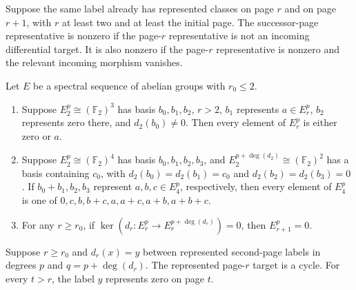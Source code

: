 \begin{theorem}
\label{sem:SpectralSequence:successor-nonzero}
Suppose the same label already has represented classes on page $r$ and on page $r+1$, with $r$ at least two and at least the initial page. The successor-page representative is nonzero if the page-$r$ representative is not an incoming differential target. It is also nonzero if the page-$r$ representative is nonzero and the relevant incoming morphism vanishes.
\end{theorem}

\begin{theorem}
\label{sem:SpectralSequence:finite-frames}
Let $E$ be a spectral sequence of abelian groups with $r_0\leq2$.
\begin{enumerate}
\item Suppose $E_2^p\cong(\mathbb F_2)^3$ has basis $b_0,b_1,b_2$, $r>2$, $b_1$ represents $a\in E_r^p$, $b_2$ represents zero there, and $d_2(b_0)\neq0$. Then every element of $E_r^p$ is either zero or $a$.
\item Suppose $E_2^p\cong(\mathbb F_2)^4$ has basis $b_0,b_1,b_2,b_3$, and $E_2^{p+\deg(d_2)}\cong(\mathbb F_2)^2$ has a basis containing $c_0$, with $d_2(b_0)=d_2(b_1)=c_0$ and $d_2(b_2)=d_2(b_3)=0$. If $b_0+b_1,b_2,b_3$ represent $a,b,c\in E_4^p$, respectively, then every element of $E_4^p$ is one of $0,c,b,b+c,a,a+c,a+b,a+b+c$.
\item For any $r\geq r_0$, if $\ker(d_r:E_r^p\to E_r^{p+\deg(d_r)})=0$, then $E_{r+1}^p=0$.
\end{enumerate}
\end{theorem}

\begin{theorem}
\label{sem:SpectralSequence:finite-hit}
Suppose $r\geq r_0$ and $d_r(x)=y$ between represented second-page labels in degrees $p$ and $q=p+\deg(d_r)$. The represented page-$r$ target is a cycle. For every $t>r$, the label $y$ represents zero on page $t$.
\end{theorem}

